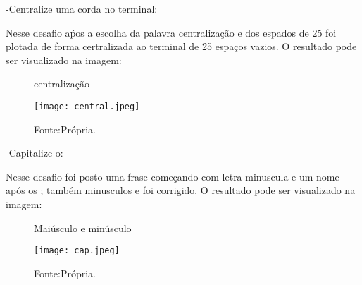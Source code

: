 -Centralize uma corda no terminal:

Nesse desafio aṕos a escolha da palavra centralização e dos espados de 25 foi plotada de forma certralizada ao terminal de 25 espaços vazios.
O resultado pode ser visualizado na imagem:
\begin{figure} [h!]	
    \centering
    \caption{centralização}
    \texttt{[image: central.jpeg]}
    \caption*{Fonte:Própria.}
    \label{fig:centralizar}
\end{figure}






-Capitalize-o:

Nesse desafio foi posto uma frase começando com letra minuscula e um nome após os ; também minusculos e foi corrigido.
O resultado pode ser visualizado na imagem:
\begin{figure} [h!]	
    \centering
    \caption{Maiúsculo e minúsculo}
    \texttt{[image: cap.jpeg]}
    \caption*{Fonte:Própria.}
    \label{fig:cap}
\end{figure}
